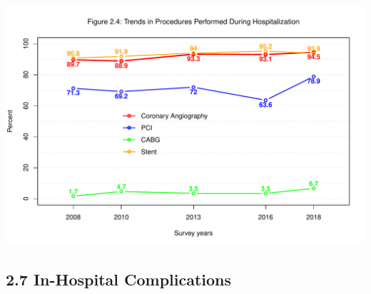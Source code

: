 \documentclass[
]{article}
\begin{document}
\hfill\break

\includegraphics{‏‏ACSIS_2024_v1_with_trend_pdf_files/figure-latex/unnamed-chunk-135-1.pdf}

\pagebreak

\subsection{2.7 In-Hospital
Complications}\label{in-hospital-complications-1}

\hfill\break
\end{document}

